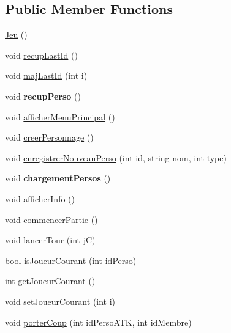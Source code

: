 \subsection*{\-Public \-Member \-Functions}
\begin{DoxyCompactItemize}
\item 
\hyperlink{class_jeu_acc5795ee00edf75516d3dfe65be3e6d6}{\-Jeu} ()
\item 
void \hyperlink{class_jeu_afc8d47d5af8133e555e0e02641dc03c9}{recup\-Last\-Id} ()
\item 
void \hyperlink{class_jeu_ac2dc12316aef3df5ffc04ace0d2ca8a3}{maj\-Last\-Id} (int i)
\item 
\hypertarget{class_jeu_ac24053e79c6d689613eb43f33a849669}{void {\bfseries recup\-Perso} ()}\label{class_jeu_ac24053e79c6d689613eb43f33a849669}

\item 
void \hyperlink{class_jeu_ae02adb2fa1ed4e84bc008fdea4c187a7}{afficher\-Menu\-Principal} ()
\item 
void \hyperlink{class_jeu_add76b474564ae0205343d3b995b43075}{creer\-Personnage} ()
\item 
void \hyperlink{class_jeu_a322a4c1a4084a44b0c5fb1cff5037391}{enregistrer\-Nouveau\-Perso} (int id, string nom, int type)
\item 
\hypertarget{class_jeu_a7dd7448e4889305f0ea21679b16d2df1}{void {\bfseries chargement\-Persos} ()}\label{class_jeu_a7dd7448e4889305f0ea21679b16d2df1}

\item 
void \hyperlink{class_jeu_a40747c204660ad830d76378d0cbac1f0}{afficher\-Info} ()
\item 
void \hyperlink{class_jeu_a0258b4e17a825904fa41213351bcd811}{commencer\-Partie} ()
\item 
void \hyperlink{class_jeu_a818d55913d9330d81cce3f0497008ba3}{lancer\-Tour} (int j\-C)
\item 
bool \hyperlink{class_jeu_a3fe3cdfb2476146d904fd9800eb932f4}{is\-Joueur\-Courant} (int id\-Perso)
\item 
int \hyperlink{class_jeu_acc947eec44204b9f472a8b4b7fb41a25}{get\-Joueur\-Courant} ()
\item 
void \hyperlink{class_jeu_a88d92d04311a3bea94fe4c5972a4dec7}{set\-Joueur\-Courant} (int i)
\item 
void \hyperlink{class_jeu_a137f9060568729f2362074fe8794c5ab}{porter\-Coup} (int id\-Perso\-A\-T\-K, int id\-Membre)
\end{DoxyCompactItemize}


